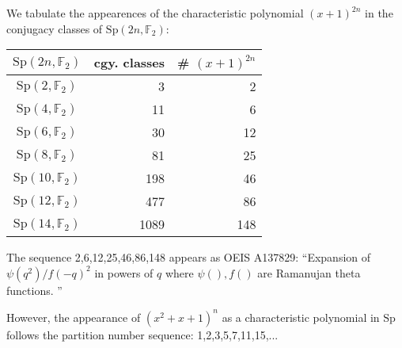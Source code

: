 \documentclass[11pt,oneside]{article}
\newcommand{\Sp}{\mathrm{Sp}}
\newcommand{\Field}{\mathbb{F}}
\begin{document}
%
%

We tabulate the appearences of the characteristic polynomial 
$(x+1)^{2n}$ in the conjugacy classes of $\Sp(2n,\Field_2)$:
\begin{center}\begin{tabular}{c|r|r}
$\Sp(2n,\Field_2)$ & cgy. classes  & \# $(x+1)^{2n}$ \\
\hline
$\Sp(2,\Field_2)$   & 3     & 2 \\
$\Sp(4,\Field_2)$   & 11    & 6 \\
$\Sp(6,\Field_2)$   & 30    & 12 \\
$\Sp(8,\Field_2)$   & 81    & 25 \\
$\Sp(10,\Field_2)$  & 198   & 46 \\
$\Sp(12,\Field_2)$  & 477   & 86 \\
$\Sp(14,\Field_2)$  & 1089  & 148 \\
\end{tabular} \end{center}
The sequence 2,6,12,25,46,86,148 appears as OEIS A137829:
``Expansion of $\psi(q^2) / f(-q)^2$ in powers of $q$ where
$\psi(), f()$ are Ramanujan theta functions. 
''

However, the appearance of $(x^2+x+1)^n$ as a characteristic polynomial
in $\Sp$ follows the partition number sequence: 1,2,3,5,7,11,15,...

{}

\end{document}
